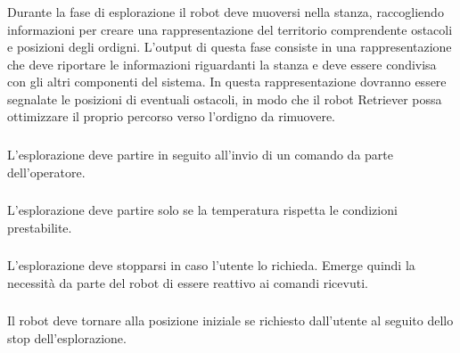 \subsubsection[R-explore]{}

Durante la fase di esplorazione il robot deve muoversi nella stanza, raccogliendo informazioni per creare una rappresentazione del territorio comprendente ostacoli e posizioni degli ordigni.
L'output di questa fase consiste in una rappresentazione che deve riportare le informazioni riguardanti la stanza e deve essere condivisa con gli altri componenti del sistema.
In questa rappresentazione dovranno essere segnalate le posizioni di eventuali ostacoli, in modo che il robot Retriever possa ottimizzare il proprio percorso verso l'ordigno da rimuovere.

\subsubsection[R-startExplore]{}

L'esplorazione deve partire in seguito all'invio di un comando da parte dell'operatore.

\subsubsection[R-TempOk]{}

L'esplorazione deve partire solo se la temperatura rispetta le condizioni prestabilite.

\subsubsection[R-stopExplore]{}

L'esplorazione deve stopparsi in caso l'utente lo richieda.
Emerge quindi la necessità da parte del robot di essere reattivo ai comandi ricevuti.

\subsubsection[R-backHome]{}

Il robot deve tornare alla posizione iniziale se richiesto dall'utente al seguito dello stop dell'esplorazione.

